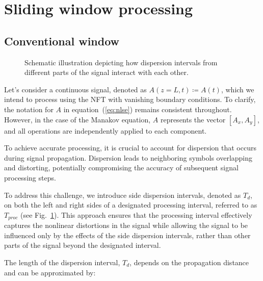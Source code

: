 \section{Sliding window processing}
\subsection{Conventional window}

\begin{figure}[!bp]
\caption{Schematic illustration depicting how dispersion intervals from different parts of the signal interact with each other.}
\label{fig:periodical_signal}
\end{figure}

Let's consider a continuous signal, denoted as $A(z = L, t) \coloneqq A(t)$, which we intend to process using the NFT with vanishing boundary conditions. To clarify, the notation for $A$ in equation~(\ref{eq:nlse}) remains consistent throughout. However, in the case of the Manakov equation, $A$ represents the vector $[A_x, A_y]$, and all operations are independently applied to each component.

To achieve accurate processing, it is crucial to account for dispersion that occurs during signal propagation. Dispersion leads to neighboring symbols overlapping and distorting, potentially compromising the accuracy of subsequent signal processing steps.

To address this challenge, we introduce side dispersion intervals, denoted as $T_d$, on both the left and right sides of a designated processing interval, referred to as $T_{proc}$ (see Fig.~\ref{fig:periodical_signal}). This approach ensures that the processing interval effectively captures the nonlinear distortions in the signal while allowing the signal to be influenced only by the effects of the side dispersion intervals, rather than other parts of the signal beyond the designated interval.

The length of the dispersion interval, $T_d$, depends on the propagation distance and can be approximated by:


